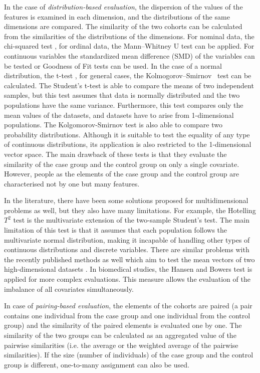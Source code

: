 In the case of \textit{distribution-based evaluation}, the dispersion of the values of the features is examined in each dimension, and the distributions of the same dimensions are compared. The similarity of the two cohorts can be calculated from the similarities of the distributions of the dimensions. For nominal data, the chi-squared test \cite{pearson1900x}, for ordinal data, the Mann--Whitney U test \cite{macfarland2016mann, mcknight2010mann} can be applied. For continuous variables the standardized mean difference (SMD) \cite{austin2009balance} of the variables can be tested or Goodness of Fit tests can be used. In the case of a normal distribution, the t-test \cite{student1908probable}, for general cases, the Kolmogorov--Smirnov~\cite{kolmogorov1933sulla, smirnov1948table} test can be calculated. The Student's t-test is able to compare the means of two independent samples, but this test assumes that data is normally distributed and the two populations have the same variance. Furthermore, this test compares only the mean values of the datasets, and datasets have to arise from 1-dimensional populations. The Kolgomorov-Smirnov test is also able to compare two probability distributions. Although it is suitable to test the equality of any type of continuous distributions, its application is also restricted to the 1-dimensional vector space. The main drawback of these tests is that they evaluate the similarity of the case group and the control group on only a single covariate. However, people as the elements of the case group and the control group are characterised not by one but many features.

In the literature, there have been some solutions proposed for multidimensional problems as well, but they also have many limitations. For example, the Hotelling $T^2$ test \cite{hotelling1931generalization} is the multivariate extension of the two-sample Student's test. The main limitation of this test is that it assumes that each population follows the multivariate normal distribution, making it incapable of handling other types of continuous distributions and discrete variables. There are similar problems with the recently published methods as well which aim to test the mean vectors of two high-dimensional datasets \cite{park2013test, srivastava2013two, wang2015high}. In biomedical studies, the Hansen and Bowers test \cite{bowers2010ritools} is applied for more complex evaluations. This measure allows the evaluation of the imbalance of all covariates simultaneously.

In case of \textit{pairing-based evaluation}, the elements of the cohorts are paired (a pair contains one individual from the case group and one individual from the control group) and the similarity of the paired elements is evaluated one by one. The similarity of the two groups can be calculated as an aggregated value of the pairwise similarities (i.e. the average or the weighted average of the pairwise similarities). If the size (number of individuals) of the case group and the control group is different, one-to-many assignment can also be used.

